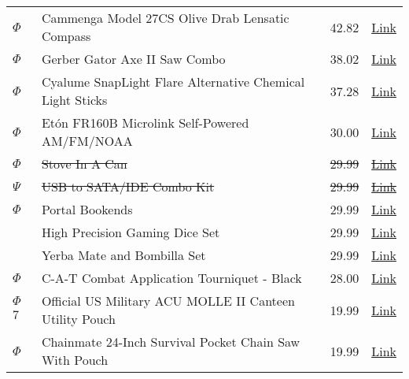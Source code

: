 \documentclass[12pt]{article}
\begin{document}
\begin{longtable}{ | p{1.3cm} | p{12cm} | l | l |}
$\Phi$ & Cammenga Model 27CS Olive Drab Lensatic Compass & 42.82 & \href{http://www.amazon.com/Cammenga-Model-Olive-Lensatic-Compass/dp/B0016SRA4Y/ref=sr_1_1?s=sporting-goods&ie=UTF8&qid=1323051540&sr=1-1}{Link} \\
$\Phi$ & Gerber Gator Axe II Saw Combo & 38.02 & \href{http://www.amazon.com/Gerber-22-41420-Gator-Combo-Axe/dp/B000C0RKYM/ref=wl_it_dp_o_npd?ie=UTF8&coliid=IBB4IIPQSKDMB&colid=8BFL6AZQK4C2}{Link} \\
$\Phi$ & Cyalume SnapLight Flare Alternative Chemical Light Sticks & 37.28 & \href{http://www.amazon.com/Cyalume-SnapLight-Alternative-Chemical-Intensity/dp/B004NBZL8I/ref=sr_1_11?s=industrial&ie=UTF8&qid=1323051761&sr=1-11}{Link} \\
$\Phi$ & Etón FR160B Microlink Self-Powered AM/FM/NOAA & 30.00 & \href{http://www.amazon.com/FR160B-Microlink-Self-Powered-Weather-Flashlight/dp/B001QTXKB0/ref=wl_it_dp_o_npd?ie=UTF8&coliid=IW5L08ZYOI2L6&colid=8BFL6AZQK4C2}{Link} \\
\sout{$\Phi$} & \sout{Stove In A Can} & \sout{29.99} & \href{http://www.amazon.com/Stove-Can-Backpacking-Tailgating-Emergency/dp/B004F1N7NM/ref=sr_1_1?ie=UTF8&qid=1323052288&sr=8-1}{\sout{Link}} \\
\sout{$\Psi$} & \sout{USB to SATA/IDE Combo Kit} & \sout{29.99} & \href{http://www.thinkgeek.com/interests/techies/dd1a/}{\sout{Link}} \\
$\Phi$ & Portal Bookends & 29.99 &\href{http://www.thinkgeek.com/interests/gamer/e9cc/}{Link} \\
& High Precision Gaming Dice Set & 29.99 & \href{http://www.thinkgeek.com/geektoys/games/eb26/#tabs}{Link} \\
& Yerba Mate and Bombilla Set & 29.99 & \href{http://www.thinkgeek.com/caffeine/b4f6/}{Link} \\
$\Phi$ & C-A-T Combat Application Tourniquet - Black & 28.00 & \href{http://www.amazon.com/C-A-T-Combat-Application-Tourniquet-Black/dp/B003IPZRYI/ref=sr_1_1?ie=UTF8&qid=1324835739&sr=8-1}{Link} \\
$\Phi$ 7 & Official US Military ACU MOLLE II Canteen Utility Pouch & 19.99 & \href{http://www.amazon.com/Official-Military-Canteen-Utility-Pouch/dp/B0039D6RHK/ref=sr_1_cc_1?s=apparel&ie=UTF8&qid=1323049773&sr=1-1-catcorr}{Link} \\
$\Phi$ & Chainmate 24-Inch Survival Pocket Chain Saw With Pouch & 19.99 & \href{http://www.amazon.com/Chainmate-24-Inch-Survival-Pocket-Chain/dp/B0026OOS60/ref=pd_rhf_cr_shvl4}{Link} \\

\end{longtable}
\end{document}

